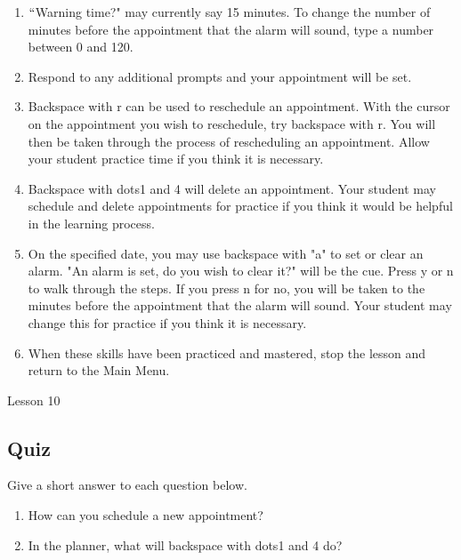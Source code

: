 \documentclass[10pt,letterpaper,twoside]{report}
\begin{document}
{{{{\begin{enumerate}
	\item $``$Warning time?" may currently say 15 minutes.  To change the number of minutes before the appointment that the alarm will sound, type a number between 0 and 120.
	      
	\item Respond to any additional prompts and your appointment will be set.
	      
	\item Backspace with r can be used to reschedule an appointment.  With the cursor on the appointment you wish to reschedule, try backspace with r.  You will then be taken through the process of rescheduling an appointment.  Allow your student practice time if you think it is necessary.
	      
	\item Backspace with dots1 and 4 will delete an appointment.  Your student may schedule and delete appointments for practice if you think it would be helpful in the learning process.
	      
	\item On the specified date, you may use backspace with "a" to set or clear an alarm.  "An alarm is set, do you wish to clear it?" will be the cue.  Press y or n to walk through the steps.  If you press n for no, you will be taken to the minutes before the appointment that the alarm will sound.  Your student may change this for practice if you think it is necessary.
	      
	\item When these skills have been practiced and mastered, stop the lesson and return to the Main Menu.
\end{enumerate}



\clearpage

\newpage
Lesson 10

\subsection{Quiz}



Give a short answer to each question below.



\begin{enumerate}
	\item How can you schedule a new appointment?
	      
	\item In the planner, what will backspace with dots1 and 4 do?
	      

\end{enumerate}}}}}
\end{document}
